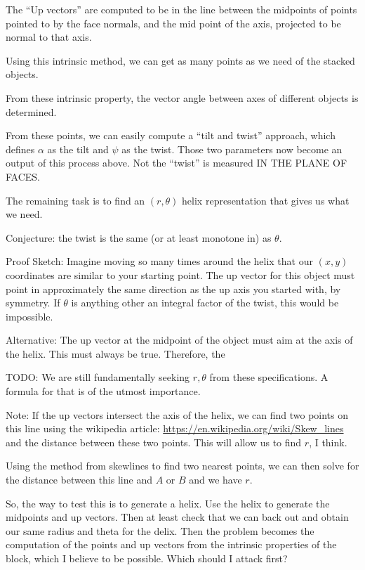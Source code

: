 \documentclass[11pt]{article}
\begin{document}
The ``Up vectors'' are computed to be in the line between the midpoints of points
pointed to by the face normals, and the mid point of the axis, projected to be normal
to that axis.

Using this intrinsic method, we can get as many points as we need of the stacked objects.

From these intrinsic property, the vector angle between axes of different objects
is determined.

From these points, we can easily compute a ``tilt and twist'' approach, which defines
$\alpha$ as the tilt and $\psi$ as the twist. Those two parameters now become
an output of this process above.  Not the ``twist'' is measured IN THE PLANE OF
FACES.

The remaining task is to find an $(r,\theta)$ helix representation that gives us
what we need.

Conjecture: the twist is the same (or at least monotone in) as $\theta$.

Proof Sketch: Imagine moving so many times around the helix that
our $(x,y)$ coordinates are similar to your starting point. The up vector
for this object must point in approximately the same direction as the up axis
you started with, by symmetry. If $\theta$ is anything other an integral
factor of the twist, this would be impossible.

Alternative: The up vector at the midpoint of the object must aim at the
axis of the helix. This must always be true. Therefore, the 

TODO: We are still fundamentally seeking $r,\theta$ from these specifications.
A formula for that is of the utmost importance.

Note: If the up vectors intersect the axis of the helix, we can find two
points on this line using the wikipedia article: \url{https://en.wikipedia.org/wiki/Skew_lines}
and the distance between these two points. This will allow us to find $r$, I think.

Using the method from skewlines to find two nearest points, we can then solve for
the distance between this line and $A$ or $B$ and we have $r$.

So, the way to test this is to generate a helix. Use the helix to generate
the midpoints and up vectors. Then at least check that we can back out and
obtain our same radius and theta for the delix.  Then the problem becomes the
computation of the points and up vectors from the intrinsic properties of the block,
which I believe to be possible.  Which should I attack first?
\end{document}
